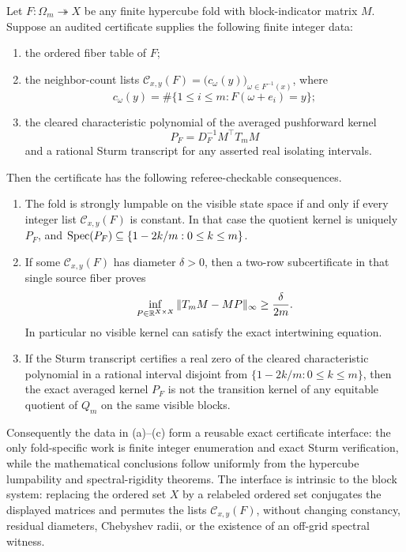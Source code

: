\begin{theorem}\label{thm:reusable-exact-certificate-interface-hypercube-folds}
Let \(F:\Omega_m\twoheadrightarrow X\) be any finite hypercube fold with block-indicator matrix \(M\).  Suppose an audited certificate supplies the following finite integer data:
\begin{enumerate}[label=\textup{(\alph*)}]
\item the ordered fiber table of \(F\);
\item the neighbor-count lists \(\mathcal C_{x,y}(F)=\bigl(c_\omega(y)\bigr)_{\omega\in F^{-1}(x)}\), where
\[
c_\omega(y)=\#\{1\le i\le m:F(\omega+e_i)=y\};
\]
\item the cleared characteristic polynomial of the averaged pushforward kernel
\[
P_F=D_F^{-1}M^\top T_mM
\]
and a rational Sturm transcript for any asserted real isolating intervals.
\end{enumerate}
Then the certificate has the following referee-checkable consequences.
\begin{enumerate}[label=\textup{(\roman*)}]
\item The fold is strongly lumpable on the visible state space if and only if every integer list \(\mathcal C_{x,y}(F)\) is constant.  In that case the quotient kernel is uniquely \(P_F\), and \(\operatorname{Spec}(P_F)\subseteq\{1-2k/m:0\le k\le m\}\).
\item If some \(\mathcal C_{x,y}(F)\) has diameter \(\delta>0\), then a two-row subcertificate in that single source fiber proves
\[
\inf_{P\in\mathbb{R}^{X\times X}}\|T_mM-MP\|_\infty\ge \frac{\delta}{2m}.
\]
In particular no visible kernel can satisfy the exact intertwining equation.
\item If the Sturm transcript certifies a real zero of the cleared characteristic polynomial in a rational interval disjoint from \(\{1-2k/m:0\le k\le m\}\), then the exact averaged kernel \(P_F\) is not the transition kernel of any equitable quotient of \(Q_m\) on the same visible blocks.
\end{enumerate}
Consequently the data in \textup{(a)}--\textup{(c)} form a reusable exact certificate interface: the only fold-specific work is finite integer enumeration and exact Sturm verification, while the mathematical conclusions follow uniformly from the hypercube lumpability and spectral-rigidity theorems.  The interface is intrinsic to the block system: replacing the ordered set \(X\) by a relabeled ordered set conjugates the displayed matrices and permutes the lists \(\mathcal C_{x,y}(F)\), without changing constancy, residual diameters, Chebyshev radii, or the existence of an off-grid spectral witness.
\end{theorem}

